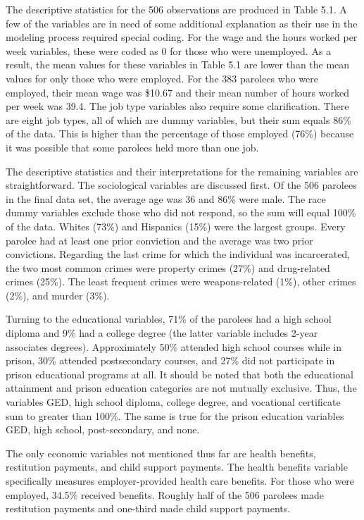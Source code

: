 The descriptive statistics for the 506 observations are produced in Table 5.1.  A few of the variables are in need of some additional explanation as their use in the modeling process required special coding.  For the wage and the hours worked per week variables, these were coded as 0 for those who were unemployed.  As a result, the mean values for these variables in Table 5.1 are lower than the mean values for only those who were employed.  For the 383 parolees who were employed, their mean wage was \$10.67 and their mean number of hours worked per week was 39.4.  The job type variables also require some clarification.  There are eight job types, all of which are dummy variables, but their sum equals 86\% of the data.  This is higher than the percentage of those employed (76\%) because it was possible that some parolees held more than one job.

The descriptive statistics and their interpretations for the remaining variables are straightforward.  The  sociological variables are discussed first.  Of the 506 parolees in the final data set, the average age was 36 and 86\% were male.  The race dummy variables exclude those who did not respond, so the sum will equal 100\% of the data.  Whites (73\%) and Hispanics (15\%) were the largest groups.  Every parolee had at least one prior conviction and the average was two prior convictions.  Regarding the last crime for which the individual was incarcerated, the two most common crimes were property crimes (27\%) and drug-related crimes (25\%).  The least frequent crimes were weapons-related (1\%), other crimes (2\%), and murder (3\%).

Turning to the educational variables, 71\% of the parolees had a high school diploma and 9\% had a college degree (the latter variable includes 2-year associates degrees).  Approximately 50\% attended high school courses while in prison, 30\% attended postsecondary courses, and 27\% did not participate in prison educational programs at all.  It should be noted that both the educational attainment and prison education categories are not mutually exclusive.  Thus, the variables GED, high school diploma, college degree, and vocational certificate sum to greater than 100\%.  The same is true for the prison education variables GED, high school, post-secondary, and none.

The only economic variables not mentioned thus far are health benefits, restitution payments, and child support payments.  The health benefits variable specifically measures employer-provided health care benefits.  For those who were employed, 34.5\% received benefits.  Roughly half of the 506 parolees made restitution payments and one-third made child support payments.

